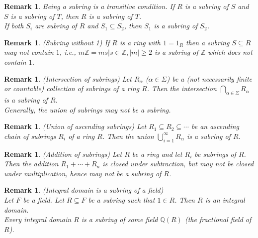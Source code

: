 \documentclass[a4paper,sfsidenotes,openany]{tufte-book}
\theoremstyle{theorem}
\newtheorem{remark}[theorem]{Remark}
\begin{document}
\begin{fullwidth}
\begin{remark}
Being a subring is a transitive condition. If $R$ is a subring of $S$ and $S$ is a subring of $T$, then $R$ is a subring of $T$.\\
If both $S_i$ are subring of $R$ and $S_1 \subseteq S_2$, then $S_1$ is a subring of $S_2$.\\
\end{remark}
\>

\begin{remark}
\textit{{\color{blue} (Subring without 1)}} If $R$ is a ring with $1 = 1_R$ then a subring $S \subseteq R$ may not contain $1$, i.e., $m\mathbb{Z} = {ms|s\in \mathbb{Z}, \left| m \right| \geq 2}$ is a subring of $\mathbb{Z}$ which does not contain $1$.
\end{remark}
\>

\begin{remark}
\textit{{\color{blue} (Intersection of subrings)}} Let $R_\alpha$ ($\alpha \in \Sigma$) be a (not necessarily finite or countable) collection of subrings of a ring $R$. Then the intersection $\bigcap\limits_{\alpha \in \Sigma} R_\alpha$ is a subring of $R$.\\
Generally, the union of subrings may not be a subring.\\
\end{remark}
\>

\begin{remark}
\textit{{\color{blue} (Union of ascending subrings)}} Let $R_1 \subseteq R_2 \subseteq \cdots $ be an ascending chain of subrings $R_i$ of a ring $R$.
Then the union $\bigcup\limits_{i=1}^{\infty} R_\alpha$ is a subring of $R$.\\
\end{remark}
\>

\begin{remark}
\textit{{\color{blue} (Addition of subrings)}} Let $R$ be a ring and let $R_i$ be subrings of $R$.\\
Then the addition $R_1 + \cdots + R_n$ is closed under subtraction, but may not be closed under multiplication, hence may not be a subring of $R$.\\
\end{remark}
\>

\begin{remark}
\textit{{\color{blue} (Integral domain is a subring of a field)}}\\
Let $F$ be a field. Let $R \subseteq F$ be a subring such that $1 \in R$. Then $R$ is an integral domain.\\
Every integral domain $R$ is a subring of some field $\mathbb{Q}(R)$ (the fractional field of $R$).\\
\end{remark}
\>


\end{fullwidth}
\end{document}
